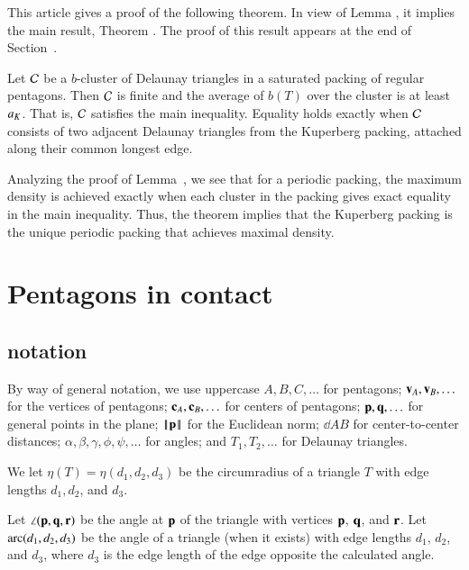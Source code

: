 This article gives a proof of the following theorem. In view of Lemma ,
it implies the main result, Theorem .  The proof of this result appears
at the end of Section~.

\begin{theorem}
  Let $\mathcal C$ be a $b$-cluster of Delaunay triangles in a saturated
  packing of regular pentagons.  Then $\mathcal C$ is finite and the average
  of $b(T)$ over the cluster is at least $a_K$.  That is, $\mathcal C$
  satisfies the main inequality.  Equality holds exactly when $\mathcal C$
  consists of two adjacent Delaunay triangles from the Kuperberg
  packing, attached along their common longest edge.
\end{theorem}

\begin{remark}
Analyzing the proof of Lemma~, we see that for a
periodic packing, the maximum density is achieved exactly when each
 cluster in the packing gives exact equality in the main inequality.
Thus, the theorem implies that the Kuperberg packing is the
unique periodic packing that achieves maximal density.
\end{remark}



\section{Pentagons in contact}


\subsection{notation}

By way of general notation, we use uppercase $A,B,C,\ldots$ for
pentagons; ${\mathbf v}_A,{\mathbf v}_B,\ldots$ for the vertices of pentagons;
${\mathbf c}_A,{\mathbf c}_B,\ldots$ for centers of pentagons; ${\mathbf p},{\mathbf q},\ldots$ for
general points in the plane; ${\hbox{\ensuremath{\hspace{0.1em}|\hspace{-0.1em}|\hspace{0.1em}}}{\mathbf p}\hbox{\ensuremath{\hspace{0.1em}|\hspace{-0.1em}|\hspace{0.1em}}}}$ for the Euclidean norm;
$\dd{A}{B}$ for center-to-center distances;
$\alpha,\beta,\gamma,\phi,\psi,\ldots$ for angles; and $T_1,T_2,\ldots$
for Delaunay triangles.

We let $\eta(T) = \eta(d_1,d_2,d_3)$ be the circumradius of a triangle
$T$ with edge lengths $d_1,d_2$, and $d_3$.

Let $\angle({\mathbf p},{\mathbf q},{\mathbf r})$ be the angle at ${\mathbf p}$ of the triangle with
vertices ${\mathbf p}$, ${\mathbf q}$, and ${\mathbf r}$.  Let $\operatorname{arc}(d_1,d_2,d_3)$ be the angle
of a triangle (when it exists) with edge lengths $d_1$, $d_2$, and
$d_3$, where $d_3$ is the edge length of the edge opposite the
calculated angle.



